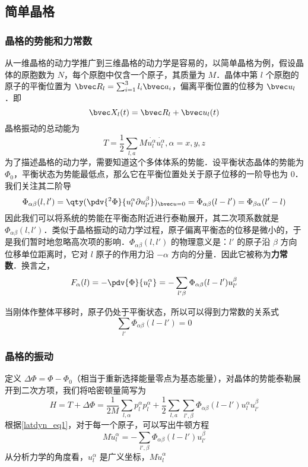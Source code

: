 
\subsection{简单晶格}
\subsubsection{晶格的势能和力常数}
从一维晶格的动力学推广到三维晶格的动力学是容易的，以简单晶格为例，假设晶体的原胞数为 $N$，每个原胞中仅含一个原子，其质量为 $M$．晶体中第 $l$ 个原胞的原子的平衡位置为 $\bvec R_l=\sum_{i=1}^3 l_i\bvec a_i$，偏离平衡位置的位移为 $\bvec u_l$．即
\begin{equation}
\bvec X_l(t)=\bvec R_l+\bvec u_l(t)
\end{equation}
晶格振动的总动能为
\begin{equation}
T=\frac{1}{2}\sum_{l,a} M \dot{u_l^\alpha}\dot{u_l^\alpha},\alpha=x,y,z
\end{equation}
为了描述晶格的动力学，需要知道这个多体体系的势能．设平衡状态晶体的势能为 $\Phi_0$，平衡状态为势能最低点，那么它在平衡位置处关于原子位移的一阶导也为 $0$．我们关注其二阶导
\begin{equation}
\Phi_{\alpha\beta}(l,l')=\qty(\pdv{^2\Phi}{u_l^\alpha\partial u_{l'}^\beta})_{\bvec u=0}=\Phi_{\alpha\beta}(l-l')=\Phi_{\beta\alpha}(l'-l)
\end{equation}
因此我们可以将系统的势能在平衡态附近进行泰勒展开，其二次项系数就是 $\Phi_{\alpha\beta}(l,l')$．类似于晶格振动的动力学过程，原子偏离平衡态的位移是微小的，于是我们暂时地忽略高次项的影响．$\Phi_{\alpha\beta}(l,l')$ 的物理意义是：$l'$ 的原子沿 $\beta$ 方向位移单位距离时，它对 $l$ 原子的作用力沿 $-\alpha$ 方向的分量．因此它被称为\textbf{力常数}．换言之，
\begin{equation}\label{latdyn_eq1}
F_\alpha(l)=-\pdv{\Phi}{u_l^\alpha}=-\sum_{l'\beta}\Phi_{\alpha\beta}(l-l')u_{l'}^\beta
\end{equation}

当刚体作整体平移时，原子仍处于平衡状态，所以可以得到力常数的关系式
\begin{equation}
\sum_{l'}\Phi_{\alpha\beta}(l-l')=0
\end{equation}
\subsubsection{晶格的振动}
定义 $\Delta \Phi=\Phi-\Phi_0$（相当于重新选择能量零点为基态能量），对晶体的势能泰勒展开到二次方项，我们将哈密顿量简写为
\begin{equation}
H=T+\Delta \Phi=\frac{1}{2M}\sum_{l,\alpha}p_l^\alpha p_l^\alpha + \frac{1}{2}\sum_{l,a}\sum_{l',\beta}\Phi_{\alpha\beta}(l-l')u_l^\alpha u_{l'}^\beta
\end{equation}
根据\autoref{latdyn_eq1}，对于每一个原子，可以写出牛顿方程
\begin{equation}
M \ddot{u}_l^\alpha = -\sum_{l',\beta}\Phi_{\alpha\beta}(l-l')u_{l'}^\beta
\end{equation}
从分析力学的角度看，$u_l^\alpha$ 是广义坐标，$M\dot{u}_l^\alpha$